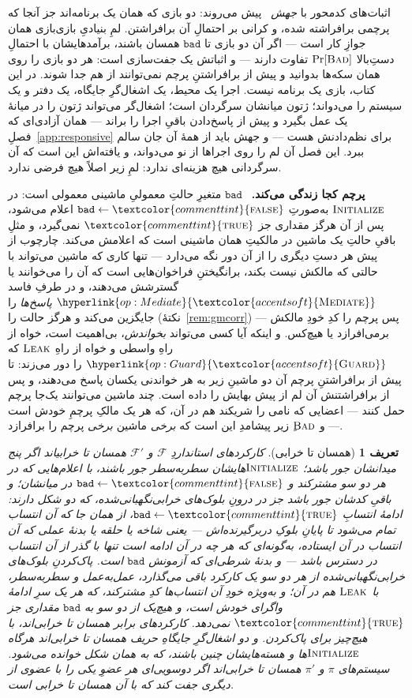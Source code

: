 \documentclass[10pt,oneside,openany]{book}
\newcommand{\F}{\mathcal{F}}
\newcommand{\op}[1]{\textnormal{\textsc{#1}}}
\newcommand{\opl}[1]{\hyperlink{op:#1}{\textcolor{accentsoft}{\op{#1}}}}
\newcommand{\atom}[1]{\textcolor{commenttint}{\op{#1}}}
\newcommand{\true}{\atom{true}}
\newcommand{\false}{\atom{false}}
\newcommand{\Bad}{\op{Bad}}
\newcommand{\V}[1]{\mathtt{#1}}
\newcommand{\heading}[1]{\medskip\par\noindent\textcolor{accent}{\textbf{#1.}}\ }
\theoremstyle{accentdef}
\newtheorem{definition}{تعریف}[chapter]
\theoremstyle{accentplain}
\begin{document}
اثبات‌های کدمحور با \emph{جهش}~\cite{BR06,Shoup04} پیش می‌روند: دو بازی که
همان یک برنامه‌اند جز آنجا که پرچمی برافراشته شده، و کرانی بر احتمالِ آن
برافراشتن. لمِ بنیادیِ بازی‌بازی همان جوازِ کار است --- اگر آن دو بازی تا
$\V{bad}$ همسان باشند، برآمدهایشان با احتمالِ دستِ‌بالا $\Pr[\Bad]$ تفاوت
دارند --- و اثباتش یک جفت‌سازی است: هر دو بازی را روی همان سکه‌ها بدوانید و
پیش از برافراشتنِ پرچم نمی‌توانند از هم جدا شوند. در این کتاب، بازی یک
برنامه نیست. اجرا یک محیط، یک اشغال‌گرِ جایگاه، یک دفتر و یک سیستم را
می‌دواند؛ ژتون میانشان سرگردان است؛ اشغال‌گر می‌تواند ژتون را در میانهٔ یک
عمل بگیرد و پیش از پاسخ‌دادن باقیِ اجرا را براند --- همان آزادی‌ای که
فصلِ~\ref{app:responsive} برای نظم‌دادنش هست --- و جهش باید از همهٔ آن جان
سالم ببرد. این فصل آن لم را روی اجراها از نو می‌دواند، و یافته‌اش این است که
آن سرگردانی هیچ هزینه‌ای ندارد: لمِ زیر اصلاً هیچ فرضی ندارد.

\heading{پرچم کجا زندگی می‌کند} $\V{bad}$ متغیرِ حالتِ معمولیِ ماشینی
معمولی است: در $\op{Initialize}$ به‌صورتِ $\V{bad} \gets \false$ اعلام
می‌شود، پس از آن هرگز مقداری جز $\true$ نمی‌گیرد، و مثلِ باقیِ حالتِ یک
ماشین در مالکیتِ همان ماشینی است که اعلامش می‌کند. چارچوب از پیش هر دستِ
دیگری را از آن دور نگه می‌دارد --- تنها کاری که ماشین می‌تواند با حالتی که
مالکش نیست بکند، برانگیختنِ فراخوان‌هایی است که آن را می‌خوانند یا گسترشش
می‌دهند، و در طرفِ فاسد $\opl{Mediate}$ \emph{پاسخ‌ها} را جایگزین می‌کند و
هرگز حالت را (نکتهٔ~\ref{rem:gmcorr}) --- پس پرچم را کدِ خودِ مالکش
برمی‌افرازد یا هیچ‌کس. و اینکه آیا کسی می‌تواند \emph{بخواندش}، بی‌اهمیت
است، خواه از راهِ واسطی و خواه از راهِ $\op{Leak}$ که $\opl{Guard}$ را دور
می‌زند: تا پیش از برافراشتنِ پرچم آن دو ماشینِ زیر به هر خواندنی یکسان پاسخ
می‌دهند، و پس از برافراشتنش آن لم از پیش بهایش را داده است. چند ماشین
می‌توانند یک‌جا پرچم حمل کنند --- اعضایی که نامی را شریکند هم در آن، که هر یک
مالکِ پرچمِ خودش است --- و $\Bad$ِ زیر پیشامدِ این است که \emph{برخی} ماشین
\emph{برخی} پرچم را برافرازد.

\begin{definition}[همسان تا خرابی]\label{def:iub}
کارکردهای استانداردِ $\F$ و $\F'$ \emph{همسان تا خرابی}اند اگر پنج
میدانشان جور باشد؛ $\op{Initialize}$هایشان سطر‌به‌سطر جور باشند، با
اعلام‌هایی که در هر دو سو مشترکند و $\V{bad} \gets \false$ در میانشان؛ و
باقیِ کدشان جور باشد جز در درونِ بلوک‌های \emph{خرابی‌نگهبانی‌شده}، که دو
شکل دارند: ادامهٔ انتسابِ $\V{bad} \gets \true$، از همان جا که آن انتساب
تمام می‌شود تا پایانِ \emph{بلوکِ دربرگیرنده}‌اش --- یعنی شاخه یا حلقه یا
بدنهٔ عملی که آن انتساب در آن ایستاده، به‌گونه‌ای که هر چه در آن ادامه است
تنها با گذر از آن انتساب در دسترس باشد --- و بدنهٔ شرطی‌ای که آزمونش
$\V{bad}$ است. پاک‌کردنِ بلوک‌های خرابی‌نگهبانی‌شده از هر دو سو یک کارکرد
باقی می‌گذارد، عمل‌به‌عمل و سطر‌به‌سطر، با $\op{Leak}$ هم در آن؛ و به‌ویژه
خودِ آن انتساب‌ها کدِ مشترکند، که هر یک سرِ ادامهٔ واگرای خودش است، و هیچ‌یک از
دو سو به $\V{bad}$ مقداری جز $\true$ نمی‌دهد. کارکردهای برابر همسان تا
خرابی‌اند، با هیچ‌چیز برای پاک‌کردن. و دو اشغال‌گرِ جایگاهِ حریف همسان تا
خرابی‌اند هرگاه $\op{Initialize}$ها و هسته‌هایشان چنین باشند، که به همان
شکل خوانده می‌شود. سیستم‌های $\pi$ و $\pi'$ همسان تا خرابی‌اند اگر دوسویی‌ای
هر عضوِ یکی را با عضوی از دیگری جفت کند که با آن همسان تا خرابی است.
\end{definition}
\end{document}
